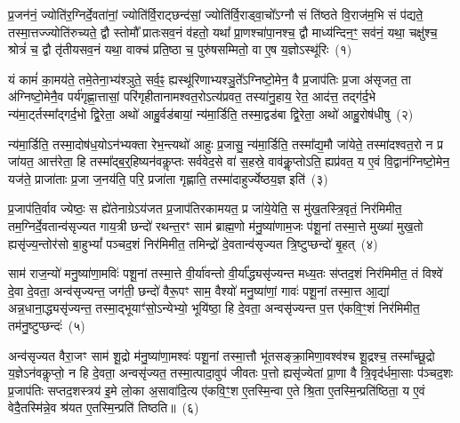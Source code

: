 \setcounter{anuvakam}{0}
प्र॒जन॑नं॒ ज्योति॑र॒ग्निर्दे॒वता॑नां॒ ज्योति॑र्वि॒राट्छन्द॑सां॒ ज्योति॑र्वि॒राड्वा॒चो᳚\-ऽग्नौ सं ति॑ष्ठते वि॒राज॑म॒भि सं प॑द्यते॒ तस्मा॒\-त्तज्ज्योति॑रुच्यते॒ द्वौ स्तोमौ᳚ प्रातःसव॒नं व॑हतो॒ यथा᳚ प्रा॒णश्चा॑पा॒नश्च॒ द्वौ माध्य॑न्दिन॒ꣳ॒ सव॑नं॒ यथा॒ चक्षु॑श्च॒ श्रोत्रं॑ च॒ द्वौ तृ॑तीय\-सव॒नं यथा॒ वाक्च॑ प्रति॒ष्ठा च॒ पुरु॑षसम्मितो॒ वा ए॒ष य॒ज्ञो\-ऽस्थू॑रिः~(१)\ip

यं कामं॑ का॒मय॑ते॒ तमे॒तेना॒भ्य॑श्ञुते॒ सर्व॒ꣴ॒ ह्यस्थू॑रिणाभ्यश्ञु॒ते᳚\-ऽग्निष्टो॒मेन॒ वै प्र॒जा\-प॑तिः प्र॒जा अ॑सृजत॒ ता अ॑ग्निष्टो॒मेनै॒व पर्य॑गृह्णा॒त्तासां॒ परि॑गृहीतानामश्वत॒रो\-ऽत्य॑प्रवत॒ तस्या॑नु॒हाय॒ रेत॒ आद॑त्त॒ तद्ग॑र्द॒भे न्य॑मा॒र्ट्तस्मा᳚द्\-गर्द॒भो द्वि॒रेता॒ अथो॑ आहु॒र्वड॑बायां॒ न्य॑मा॒र्डिति॒ तस्मा॒द्वड॑बा द्वि॒रेता॒ अथो॑ आहु॒रोष॑धीषु~(२)\ip

न्य॑मा॒र्डिति॒ तस्मा॒दोष॑ध॒यो\-ऽन॑भ्यक्ता रेभ॒न्त्यथो॑ आहुः प्र॒जासु॒ न्य॑मा॒र्डिति॒ तस्मा᳚द्\-य॒मौ जा॑येते॒ तस्मा॑दश्वत॒रो न प्र जा॑यत॒ आत्त॑रेता॒ हि तस्मा᳚द्\-ब॒र्॒\mbox{}हिष्यन॑वकॢप्तः सर्ववेद॒से वा॑ स॒हस्रे॒ वाव॑कॢ॒प्तो\-ऽति॒ ह्यप्र॑वत॒ य ए॒वं वि॒द्वान॑ग्निष्टो॒मेन॒ यज॑ते॒ प्राजा॑ताः प्र॒जा ज॒नय॑ति॒ परि॒ प्रजा॑ता गृह्णाति॒ तस्मा॑दाहुर्ज्येष्ठय॒ज्ञ इति॑~(३)\ip

प्र॒जा\-प॑ति॒र्वाव ज्येष्ठः॒ स ह्ये॑तेनाग्रे\-ऽय॑जत प्र॒जा\-प॑तिरकामयत॒ प्र जा॑ये॒येति॒ स मु॑ख॒तस्त्रि॒वृतं॒ निर॑मिमीत॒ तम॒ग्नि\-र्दे॒वतान्व॑सृज्यत गाय॒त्री छन्दो॑ रथन्त॒रꣳ साम॑ ब्राह्म॒णो म॑नु॒ष्या॑णाम॒जः प॑शू॒नां तस्मा॒त्ते मुख्या॑ मुख॒तो ह्यसृ॑ज्य॒न्तोर॑सो बा॒हु\-भ्यां᳚ पञ्चद॒शं निर॑मिमीत॒ तमिन्द्रो॑ दे॒वतान्व॑सृज्यत त्रि॒ष्टुप्छन्दो॑ बृ॒हत्~(४)\ip

साम॑ राज॒न्यो॑ मनु॒ष्या॑णा॒मविः॑ पशू॒नां तस्मा॒त्ते वी॒र्या॑वन्तो वी॒र्या᳚द्ध्यसृ॑ज्यन्त मध्य॒तः स॑प्तद॒शं निर॑मिमीत॒ तं विश्वे॑ दे॒वा दे॒वता॒ अन्व॑सृज्यन्त॒ जग॑ती॒ छन्दो॑ वैरू॒पꣳ साम॒ वैश्यो॑ मनु॒ष्या॑णां॒ गावः॑ पशू॒नां तस्मा॒त्त आ॒द्या॑ अन्न॒धाना॒\-द्ध्यसृ॑ज्यन्त॒ तस्मा॒द्भूयाꣳ॑सो॒\-ऽन्येभ्यो॒ भूयि॑ष्ठा॒ हि दे॒वता॒ अन्वसृ॑ज्यन्त प॒त्त ए॑कवि॒ꣳ॒शं निर॑मिमीत॒ तम॑नु॒ष्टुप्छन्दः॑~(५)\ip

अन्व॑सृज्यत वैरा॒जꣳ साम॑ शू॒द्रो म॑नु॒ष्या॑णा॒मश्वः॑ पशू॒नां तस्मा॒त्तौ भू॑तसङ्क्रा॒मिणा॒वश्व॑श्च शू॒द्रश्च॒ तस्मा᳚च्छू॒द्रो य॒ज्ञे\-ऽन॑वकॢप्तो॒ न हि दे॒वता॒ अन्वसृ॑ज्यत॒ तस्मा॒त्पादा॒वुप॑ जीवतः प॒त्तो ह्यसृ॑ज्येतां प्रा॒णा वै त्रि॒वृद॑र्धमा॒साः प॑ञ्चद॒शः प्र॒जा\-प॑तिः सप्तद॒शस्त्रय॑ इ॒मे लो॒का अ॒सावा॑दि॒त्य ए॑कवि॒ꣳ॒श ए॒तस्मि॒न्वा ए॒ते श्रि॒ता ए॒तस्मि॒न्प्रति॑ष्ठिता॒ य ए॒वं वेदै॒तस्मि॑न्ने॒व श्र॑यत ए॒तस्मि॒न्प्रति॑ तिष्ठति॥~(६)\ip


